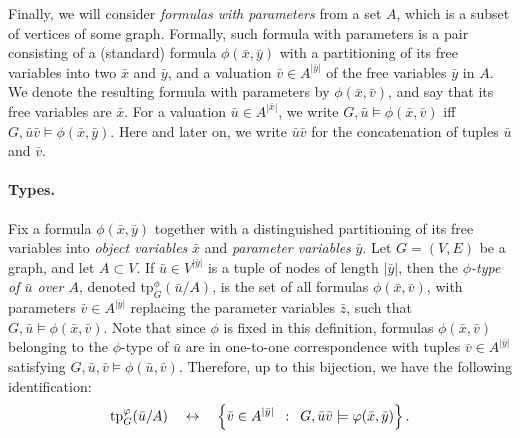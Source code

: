 Finally, we will consider \emph{formulas with parameters}
from a set $A$, which is a subset of vertices of some graph.
Formally, such formula with parameters is a pair consisting of a (standard) formula $\phi(\bar x,\bar y)$
with a partitioning of its free variables into two $\bar x$ and $\bar y$,
and a valuation $\bar v\in A^{|\bar y|}$ of the free variables $\bar y$ in $A$.
We denote the resulting formula with parameters by $\phi(\bar x,\bar v)$, and say that its free variables 
are $\bar x$. For a valuation $\bar u\in A^{|\bar x|}$,
we write $G,\bar u\models \phi(\bar x,\bar v)$
iff $G,\bar u\bar v\models \phi(\bar x,\bar y)$. Here and later on, we write $\bar u\bar v$ for the concatenation of tuples $\bar u$ and $\bar v$.

\newcommand{\tp}{\mathrm{tp}}

\paragraph{Types.}
Fix a formula $\phi(\bar x,\bar y)$ together with a distinguished partitioning of its free variables into 
\emph{object variables} $\bar x$ and \emph{parameter variables} $\bar y$. 
Let $G=(V,E)$ be a graph, and let $A\subset V$.
If $\bar u\in V^{|\bar y|}$ is a tuple of 
nodes of length $|\bar y|$, then the 
\emph{$\phi$-type of $\bar u$ over $A$},
denoted $\tp^\phi_G(\bar u/A)$,
is the set of all
formulas $\phi(\bar x,\bar v)$,
with parameters $\bar v\in A^{|\bar y|}$
replacing the parameter variables $\bar z$,
such that $G,\bar u\models \phi(\bar x,\bar v)$.
Note that since $\phi$ is fixed in this definition, formulas $\phi(\bar x,\bar v)$ belonging to the $\phi$-type of $\bar u$ are in one-to-one correspondence
with tuples $\bar v\in A^{|\bar y|}$ satisfying $G,\bar u,\bar v\models \phi(\bar u,\bar v)$.
Therefore, up to this bijection, we have the following identification:
\begin{equation}\label{eq:bijection}
\tp^\phi_G(\bar u/A)\quad\leftrightarrow\quad\setof{\bar v\in  A^{|\bar y|}}{G, \bar u\bar v\models \phi(\bar x,\bar y)}.
\end{equation}

